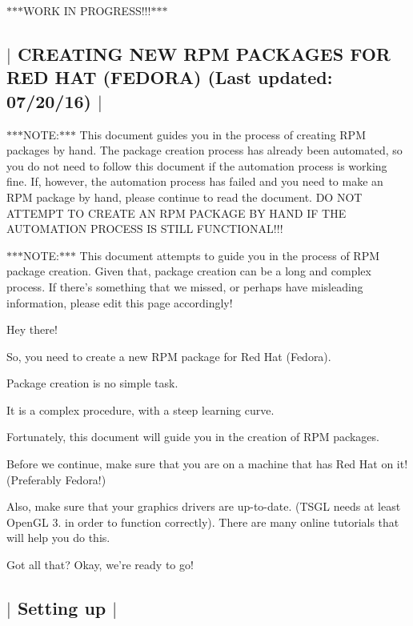 $\ast$$\ast$$\ast$\-W\-O\-R\-K I\-N P\-R\-O\-G\-R\-E\-S\-S!!!$\ast$$\ast$$\ast$ 

 \subsection*{$\vert$ C\-R\-E\-A\-T\-I\-N\-G N\-E\-W R\-P\-M P\-A\-C\-K\-A\-G\-E\-S F\-O\-R R\-E\-D H\-A\-T (F\-E\-D\-O\-R\-A) (Last updated\-: 07/20/16) $\vert$ }

$\ast$$\ast$$\ast$\-N\-O\-T\-E\-:$\ast$$\ast$$\ast$ This document guides you in the process of creating R\-P\-M packages by hand. The package creation process has already been automated, so you do not need to follow this document if the automation process is working fine. If, however, the automation process has failed and you need to make an R\-P\-M package by hand, please continue to read the document. D\-O N\-O\-T A\-T\-T\-E\-M\-P\-T T\-O C\-R\-E\-A\-T\-E A\-N R\-P\-M P\-A\-C\-K\-A\-G\-E B\-Y H\-A\-N\-D I\-F T\-H\-E A\-U\-T\-O\-M\-A\-T\-I\-O\-N P\-R\-O\-C\-E\-S\-S I\-S S\-T\-I\-L\-L F\-U\-N\-C\-T\-I\-O\-N\-A\-L!!!

$\ast$$\ast$$\ast$\-N\-O\-T\-E\-:$\ast$$\ast$$\ast$ This document attempts to guide you in the process of R\-P\-M package creation. Given that, package creation can be a long and complex process. If there's something that we missed, or perhaps have misleading information, please edit this page accordingly!

Hey there!

So, you need to create a new R\-P\-M package for Red Hat (Fedora).

Package creation is no simple task.

It is a complex procedure, with a steep learning curve.

Fortunately, this document will guide you in the creation of R\-P\-M packages.

Before we continue, make sure that you are on a machine that has Red Hat on it! (Preferably Fedora!)

Also, make sure that your graphics drivers are up-\/to-\/date. (T\-S\-G\-L needs at least Open\-G\-L 3. in order to function correctly). There are many online tutorials that will help you do this.

Got all that? Okay, we're ready to go! 

 \subsection*{$\vert$ Setting up $\vert$ }

